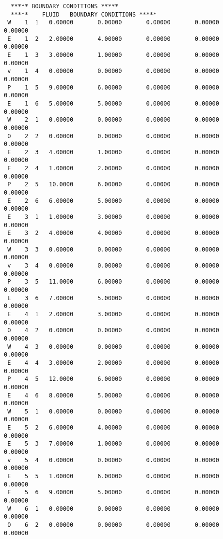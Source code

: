 \begin{verbatim}
  ***** BOUNDARY CONDITIONS *****
  *****    FLUID   BOUNDARY CONDITIONS *****
 W    1  1   0.00000       0.00000       0.00000       0.00000       0.00000    
 E    1  2   2.00000       4.00000       0.00000       0.00000       0.00000    
 E    1  3   3.00000       1.00000       0.00000       0.00000       0.00000    
 v    1  4   0.00000       0.00000       0.00000       0.00000       0.00000    
 P    1  5   9.00000       6.00000       0.00000       0.00000       0.00000    
 E    1  6   5.00000       5.00000       0.00000       0.00000       0.00000    
 W    2  1   0.00000       0.00000       0.00000       0.00000       0.00000    
 O    2  2   0.00000       0.00000       0.00000       0.00000       0.00000    
 E    2  3   4.00000       1.00000       0.00000       0.00000       0.00000    
 E    2  4   1.00000       2.00000       0.00000       0.00000       0.00000    
 P    2  5   10.0000       6.00000       0.00000       0.00000       0.00000    
 E    2  6   6.00000       5.00000       0.00000       0.00000       0.00000    
 E    3  1   1.00000       3.00000       0.00000       0.00000       0.00000    
 E    3  2   4.00000       4.00000       0.00000       0.00000       0.00000    
 W    3  3   0.00000       0.00000       0.00000       0.00000       0.00000    
 v    3  4   0.00000       0.00000       0.00000       0.00000       0.00000    
 P    3  5   11.0000       6.00000       0.00000       0.00000       0.00000    
 E    3  6   7.00000       5.00000       0.00000       0.00000       0.00000    
 E    4  1   2.00000       3.00000       0.00000       0.00000       0.00000    
 O    4  2   0.00000       0.00000       0.00000       0.00000       0.00000    
 W    4  3   0.00000       0.00000       0.00000       0.00000       0.00000    
 E    4  4   3.00000       2.00000       0.00000       0.00000       0.00000    
 P    4  5   12.0000       6.00000       0.00000       0.00000       0.00000    
 E    4  6   8.00000       5.00000       0.00000       0.00000       0.00000    
 W    5  1   0.00000       0.00000       0.00000       0.00000       0.00000    
 E    5  2   6.00000       4.00000       0.00000       0.00000       0.00000    
 E    5  3   7.00000       1.00000       0.00000       0.00000       0.00000    
 v    5  4   0.00000       0.00000       0.00000       0.00000       0.00000    
 E    5  5   1.00000       6.00000       0.00000       0.00000       0.00000    
 E    5  6   9.00000       5.00000       0.00000       0.00000       0.00000    
 W    6  1   0.00000       0.00000       0.00000       0.00000       0.00000    
 O    6  2   0.00000       0.00000       0.00000       0.00000       0.00000    

\end{verbatim}
